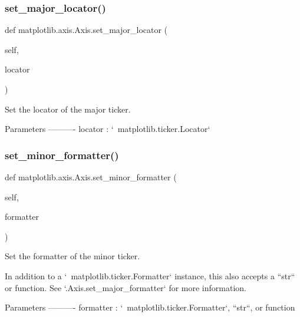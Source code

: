 \subsubsection{\texorpdfstring{set\+\_\+major\+\_\+locator()}{set\_major\_locator()}}
{\footnotesize\ttfamily def matplotlib.\+axis.\+Axis.\+set\+\_\+major\+\_\+locator (\begin{DoxyParamCaption}\item[{}]{self,  }\item[{}]{locator }\end{DoxyParamCaption})}

\begin{DoxyVerb}Set the locator of the major ticker.

Parameters
----------
locator : `~matplotlib.ticker.Locator`
\end{DoxyVerb}
 \mbox{\label{classmatplotlib_1_1axis_1_1Axis_a023626a604db3398916697564679b72b}} 
\subsubsection{\texorpdfstring{set\+\_\+minor\+\_\+formatter()}{set\_minor\_formatter()}}
{\footnotesize\ttfamily def matplotlib.\+axis.\+Axis.\+set\+\_\+minor\+\_\+formatter (\begin{DoxyParamCaption}\item[{}]{self,  }\item[{}]{formatter }\end{DoxyParamCaption})}

\begin{DoxyVerb}Set the formatter of the minor ticker.

In addition to a `~matplotlib.ticker.Formatter` instance,
this also accepts a ``str`` or function.
See `.Axis.set_major_formatter` for more information.

Parameters
----------
formatter : `~matplotlib.ticker.Formatter`, ``str``, or function
\end{DoxyVerb}
 \mbox{\label{classmatplotlib_1_1axis_1_1Axis_a78859a1dd1527f3fd24e194b56caffff}} 
